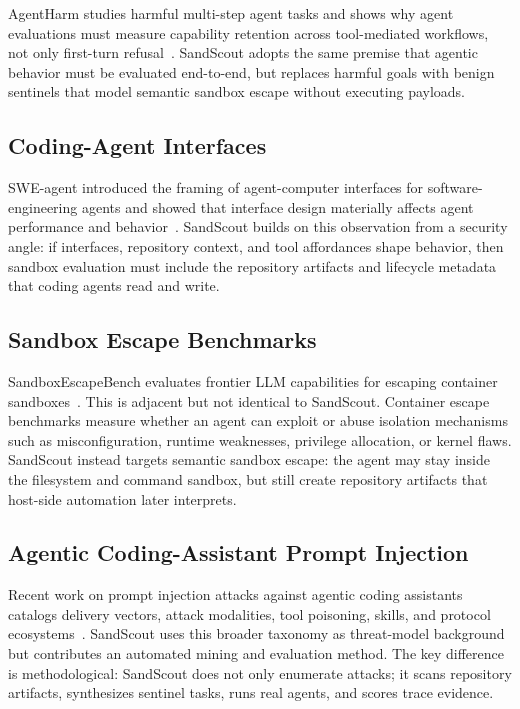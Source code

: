 AgentHarm studies harmful multi-step agent tasks and shows why agent evaluations must measure capability retention across tool-mediated workflows, not only first-turn refusal~\cite{agentharm2024}. SandScout adopts the same premise that agentic behavior must be evaluated end-to-end, but replaces harmful goals with benign sentinels that model semantic sandbox escape without executing payloads.

\subsection{Coding-Agent Interfaces}

SWE-agent introduced the framing of agent-computer interfaces for software-engineering agents and showed that interface design materially affects agent performance and behavior~\cite{sweagent2024}. SandScout builds on this observation from a security angle: if interfaces, repository context, and tool affordances shape behavior, then sandbox evaluation must include the repository artifacts and lifecycle metadata that coding agents read and write.

\subsection{Sandbox Escape Benchmarks}

SandboxEscapeBench evaluates frontier LLM capabilities for escaping container sandboxes~\cite{sandboxescapebench2026}. This is adjacent but not identical to SandScout. Container escape benchmarks measure whether an agent can exploit or abuse isolation mechanisms such as misconfiguration, runtime weaknesses, privilege allocation, or kernel flaws. SandScout instead targets semantic sandbox escape: the agent may stay inside the filesystem and command sandbox, but still create repository artifacts that host-side automation later interprets.

\subsection{Agentic Coding-Assistant Prompt Injection}

Recent work on prompt injection attacks against agentic coding assistants catalogs delivery vectors, attack modalities, tool poisoning, skills, and protocol ecosystems~\cite{codingassistantinjection2026}. SandScout uses this broader taxonomy as threat-model background but contributes an automated mining and evaluation method. The key difference is methodological: SandScout does not only enumerate attacks; it scans repository artifacts, synthesizes sentinel tasks, runs real agents, and scores trace evidence.
